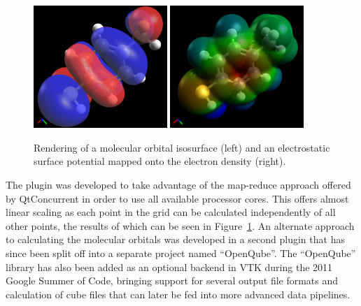 \documentclass[10pt]{bmc_article}
\newenvironment{bmcformat}{\begin{raggedright}
\baselineskip20pt\sloppy\setboolean{publ}{false}}{\end{raggedright}
\baselineskip20pt\sloppy}
\begin{document}
\begin{bmcformat}
\begin{figure}
  \begin{center}
    \includegraphics[width=0.45\textwidth]{images/avo-mbt-orb}
    \hspace*{0.1cm}
    \includegraphics[width=0.45\textwidth]{images/avo-mbt-esp}
  \end{center}
  \caption{Rendering of a molecular orbital isosurface (left) and an electrostatic
  surface potential mapped onto the electron density (right).}
 \label{f:electronic-structure}
\end{figure}

The plugin was developed to take advantage of the map-reduce approach offered
by QtConcurrent in order to use all available processor cores. This offers almost
linear scaling as each point in the grid can be calculated independently of all other
points, the results of which can be seen in Figure~\ref{f:electronic-structure}.
An alternate approach to calculating the molecular orbitals was developed
in a second plugin that has since been split off into a separate
project named ``OpenQube''. The ``OpenQube'' library has also been added as an
optional backend in VTK during the 2011 Google Summer of Code, bringing support
for several output file formats and calculation of cube files that can later be
fed into more advanced data pipelines.


\end{bmcformat}
\end{document}
